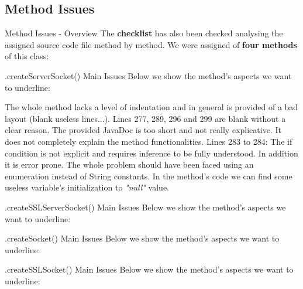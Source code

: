 \documentclass{../common/latex_classes/pdf_presentation}
\begin{document}
	\subsection{Method Issues}
	
	\begin{frame}{Method Issues - Overview}
		The \textbf{checklist} has also been checked analysing the assigned source code file method by method.
		We were assigned of \textbf{four methods} of this class:
		\begin{itemize}
		\end{itemize}
	\end{frame}
	
	\begin{frame}{.createServerSocket() Main Issues}
		Below we show the method's aspects we want to underline:
		\begin{itemize}
			 The whole method 	lacks a level of indentation and in general is provided of a bad layout (blank useless lines...).
			 Lines 277, 289, 296 and 299 are blank without a clear reason.
			 The provided JavaDoc is too short and not really explicative. It does not completely explain the method functionalities.
			 Lines 283 to 284: The if condition is not explicit and requires inference to be fully understood. In addition it is error prone. The whole problem should have been faced using an enumeration instead of String constants.
			 In the method's code we can find some useless variable's initialization to \textit{"null"} value.
		\end{itemize}
	\end{frame}
	
	\begin{frame}{.createSSLServerSocket() Main Issues}
		Below we show the method's aspects we want to underline:
		\begin{itemize}
			\itemBold{}
		\end{itemize}
	\end{frame}
	
	\begin{frame}{.createSocket() Main Issues}
		Below we show the method's aspects we want to underline:
		\begin{itemize}
			\itemBold{}
		\end{itemize}
	\end{frame}
	
	\begin{frame}{.createSSLSocket() Main Issues}
		Below we show the method's aspects we want to underline:
		\begin{itemize}
			\itemBold{}
		\end{itemize}
	\end{frame}
	
\end{document}

